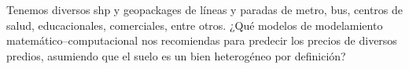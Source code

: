 \documentclass[12pt, letterpaper]{article}
\begin{document}
\newcommand{\inlinecode}[1]{%
  \colorbox{codeboxbg}{\texttt{\small #1}}%
}

\newenvironment{codeblock}{%
  \begin{tcolorbox}[
    colback=codeboxbg,
    colframe=codeborder,
    arc=4pt,
    boxrule=0.3pt,
    left=8pt, right=8pt, top=5pt, bottom=5pt,
    fontupper=\ttfamily\footnotesize,
    before={\smallskip},
    after={\smallskip}
  ]
}{%
  \end{tcolorbox}
}


\begin{usermsg}
Tenemos diversos shp y geopackages de líneas y paradas de metro, bus, centros de salud,
educacionales, comerciales, entre otros. ¿Qué modelos de modelamiento matemático--computacional
nos recomiendas para predecir los precios de diversos predios, asumiendo que el suelo es un bien
heterogéneo por definición?
\end{usermsg}
\end{document}
